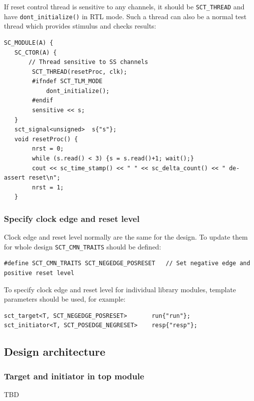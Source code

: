 If reset control thread is sensitive to any channels, it should be {\tt SCT\_THREAD} and have {\tt dont\_initialize()} in RTL mode. Such a thread can also be a normal test thread which provides stimulus and checks results:
\begin{lstlisting}[style=mycpp]
SC_MODULE(A) {
   SC_CTOR(A) {
       // Thread sensitive to SS channels
        SCT_THREAD(resetProc, clk);
        #ifndef SCT_TLM_MODE
            dont_initialize();
        #endif
        sensitive << s;
   }
   sct_signal<unsigned>  s{"s"};
   void resetProc() {
        nrst = 0; 
        while (s.read() < 3) {s = s.read()+1; wait();}
        cout << sc_time_stamp() << " " << sc_delta_count() << " de-assert reset\n";
        nrst = 1; 
   }
\end{lstlisting}

\subsubsection{Specify clock edge and reset level}

Clock edge and reset level normally are the same for the design. To update them for whole design {\tt SCT\_CMN\_TRAITS} should be defined:
\begin{lstlisting}[style=mycpp]
#define SCT_CMN_TRAITS SCT_NEGEDGE_POSRESET   // Set negative edge and positive reset level
\end{lstlisting}

To specify clock edge and reset level for individual library modules, template parameters should be used, for example:
\begin{lstlisting}[style=mycpp]
sct_target<T, SCT_NEGEDGE_POSRESET>       run{"run"};
sct_initiator<T, SCT_POSEDGE_NEGRESET>    resp{"resp"};
\end{lstlisting}


\subsection{Design architecture}
\subsubsection{Target and initiator in top module}
TBD

